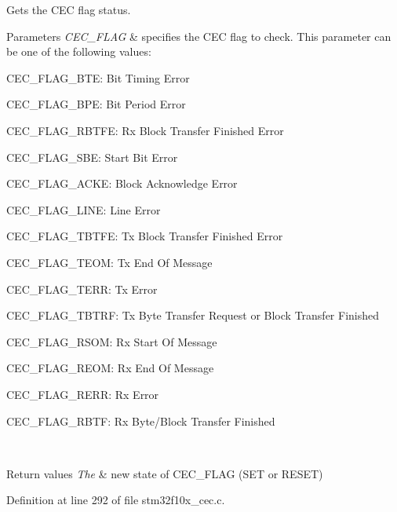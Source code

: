 Gets the C\+EC flag status. 


\begin{DoxyParams}{Parameters}
{\em C\+E\+C\+\_\+\+F\+L\+AG} & specifies the C\+EC flag to check. This parameter can be one of the following values\+: \begin{DoxyItemize}
\item C\+E\+C\+\_\+\+F\+L\+A\+G\+\_\+\+B\+TE\+: Bit Timing Error \item C\+E\+C\+\_\+\+F\+L\+A\+G\+\_\+\+B\+PE\+: Bit Period Error \item C\+E\+C\+\_\+\+F\+L\+A\+G\+\_\+\+R\+B\+T\+FE\+: Rx Block Transfer Finished Error \item C\+E\+C\+\_\+\+F\+L\+A\+G\+\_\+\+S\+BE\+: Start Bit Error \item C\+E\+C\+\_\+\+F\+L\+A\+G\+\_\+\+A\+C\+KE\+: Block Acknowledge Error \item C\+E\+C\+\_\+\+F\+L\+A\+G\+\_\+\+L\+I\+NE\+: Line Error \item C\+E\+C\+\_\+\+F\+L\+A\+G\+\_\+\+T\+B\+T\+FE\+: Tx Block Transfer Finished Error \item C\+E\+C\+\_\+\+F\+L\+A\+G\+\_\+\+T\+E\+OM\+: Tx End Of Message \item C\+E\+C\+\_\+\+F\+L\+A\+G\+\_\+\+T\+E\+RR\+: Tx Error \item C\+E\+C\+\_\+\+F\+L\+A\+G\+\_\+\+T\+B\+T\+RF\+: Tx Byte Transfer Request or Block Transfer Finished \item C\+E\+C\+\_\+\+F\+L\+A\+G\+\_\+\+R\+S\+OM\+: Rx Start Of Message \item C\+E\+C\+\_\+\+F\+L\+A\+G\+\_\+\+R\+E\+OM\+: Rx End Of Message \item C\+E\+C\+\_\+\+F\+L\+A\+G\+\_\+\+R\+E\+RR\+: Rx Error \item C\+E\+C\+\_\+\+F\+L\+A\+G\+\_\+\+R\+B\+TF\+: Rx Byte/\+Block Transfer Finished \end{DoxyItemize}
\\
\hline
\end{DoxyParams}

\begin{DoxyRetVals}{Return values}
{\em The} & new state of C\+E\+C\+\_\+\+F\+L\+AG (S\+ET or R\+E\+S\+ET) \\
\hline
\end{DoxyRetVals}


Definition at line 292 of file stm32f10x\+\_\+cec.\+c.

\mbox{\label{group___c_e_c___exported___functions_gaa1940a388d0bfcefe7483fb74cc2ba1d}} 
